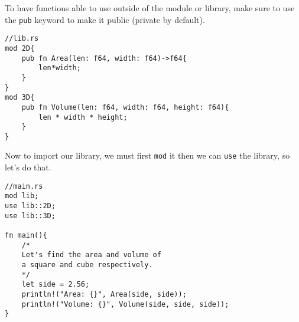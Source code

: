 \begin{remark}
To have functions able to use outside of the module or library, make sure
to use the \verb!pub! keyword to make it public (private by default).    
\end{remark}
 

\begin{lstlisting}
//lib.rs
mod 2D{
    pub fn Area(len: f64, width: f64)->f64{
        len*width; 
    }
}
mod 3D{
    pub fn Volume(len: f64, width: f64, height: f64){
        len * width * height;
    }
}
\end{lstlisting}

\par Now to import our library, we must first \verb!mod! it then we can \verb!use! the 
library, so let's do that. 

\begin{lstlisting}
//main.rs 
mod lib; 
use lib::2D;
use lib::3D;

fn main(){
    /* 
    Let's find the area and volume of 
    a square and cube respectively. 
    */  
    let side = 2.56;
    println!("Area: {}", Area(side, side));
    println!("Volume: {}", Volume(side, side, side));
}    
\end{lstlisting}